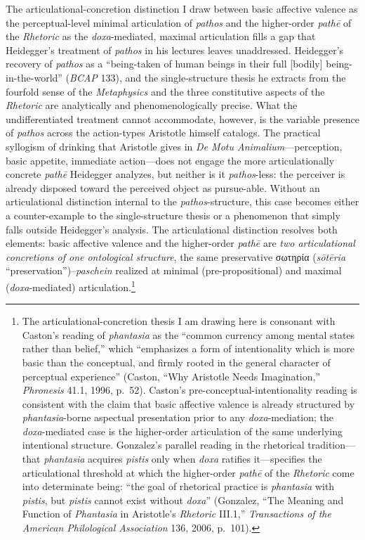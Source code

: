 \documentclass{article}
\newcommand{\gk}[1]{{\greekfont #1}}
\begin{document}
The articulational-concretion distinction I draw between basic affective valence as the perceptual-level minimal articulation of \textit{pathos} and the higher-order \textit{pathē} of the \textit{Rhetoric} as the \textit{doxa}-mediated, maximal articulation fills a gap that Heidegger's treatment of \textit{pathos} in his lectures leaves unaddressed. Heidegger's recovery of \textit{pathos} as a ``being-taken of human beings in their full [bodily] being-in-the-world'' (\textit{BCAP} 133), and the single-structure thesis he extracts from the fourfold sense of the \textit{Metaphysics} and the three constitutive aspects of the \textit{Rhetoric} are analytically and phenomenologically precise. What the undifferentiated treatment cannot accommodate, however, is the variable presence of \textit{pathos} across the action-types Aristotle himself catalogs. The practical syllogism of drinking that Aristotle gives in \textit{De Motu Animalium}---perception, basic appetite, immediate action---does not engage the more articulationally concrete \textit{pathē} Heidegger analyzes, but neither is it \textit{pathos}-less: the perceiver is already disposed toward the perceived object as pursue-able. Without an articulational distinction internal to the \textit{pathos}-structure, this case becomes either a counter-example to the single-structure thesis or a phenomenon that simply falls outside Heidegger's analysis. The articulational distinction resolves both elements: basic affective valence and the higher-order \textit{pathē} are \textit{two articulational concretions of one ontological structure}, the same preservative \gk{σωτηρία} (\textit{sōtēria} ``preservation'')--\textit{paschein} realized at minimal (pre-propositional) and maximal (\textit{doxa}-mediated) articulation.\footnote{The articulational-concretion thesis I am drawing here is consonant with Caston's reading of \textit{phantasia} as the ``common currency among mental states rather than belief,'' which ``emphasizes a form of intentionality which is more basic than the conceptual, and firmly rooted in the general character of perceptual experience'' (Caston, ``Why Aristotle Needs Imagination,'' \textit{Phronesis} 41.1, 1996, p.~52). Caston's pre-conceptual-intentionality reading is consistent with the claim that basic affective valence is already structured by \textit{phantasia}-borne aspectual presentation prior to any \textit{doxa}-mediation; the \textit{doxa}-mediated case is the higher-order articulation of the same underlying intentional structure. Gonzalez's parallel reading in the rhetorical tradition---that \textit{phantasia} acquires \textit{pistis} only when \textit{doxa} ratifies it---specifies the articulational threshold at which the higher-order \textit{pathē} of the \textit{Rhetoric} come into determinate being: ``the goal of rhetorical practice is \textit{phantasia} with \textit{pistis}, but \textit{pistis} cannot exist without \textit{doxa}'' (Gonzalez, ``The Meaning and Function of \textit{Phantasia} in Aristotle's \textit{Rhetoric} III.1,'' \textit{Transactions of the American Philological Association} 136, 2006, p.~101).}
\end{document}
